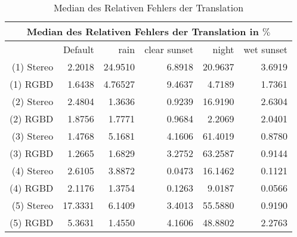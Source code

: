   \begin{table}
    \centering
      \begin{tabular}{r|r|r|r|r|r}
        \toprule %
        \multicolumn{6}{c}{Median des Relativen Fehlers der Translation in $\%$} \\
        \midrule %
        \phantom{abc} & Default & rain& clear sunset & night & wet sunset\\
        \midrule %
        (1) Stereo &  2.2018 & 24.9510 & 6.8918 & 20.9637& 3.6919\\
        \rowcolor{LightGray}
        (1) RGBD & 1.6438 & 4.76527 & 9.4637 & 4.7189& 1.7361\\
        (2) Stereo & 2.4804 & 1.3636 & 0.9239 &  16.9190&  2.6304\\
        \rowcolor{LightGray}
        (2) RGBD & 1.8756 & 1.7771 & 0.9684 &  2.2069& 2.0401\\
        (3) Stereo & 1.4768 & 5.1681 & 4.1606 & 61.4019& 0.8780\\
        \rowcolor{LightGray}
        (3) RGBD & 1.2665 & 1.6829 & 3.2752 & 63.2587& 0.9144\\
        (4) Stereo & 2.6105 &  3.8872 & 0.0473 & 16.1462& 0.1121\\
        \rowcolor{LightGray}
        (4) RGBD & 2.1176 & 1.3754 &  0.1263 & 9.0187& 0.0566\\
        (5) Stereo &  17.3331 &  6.1409 & 3.4013 & 55.5880&0.9190\\
        \rowcolor{LightGray}
        (5) RGBD & 5.3631 &  1.4550 & 4.1606 & 48.8802& 2.2763\\	
        \bottomrule %
      \end{tabular}
    \caption{Median des Relativen Fehlers der Translation}
  \end{table} 	